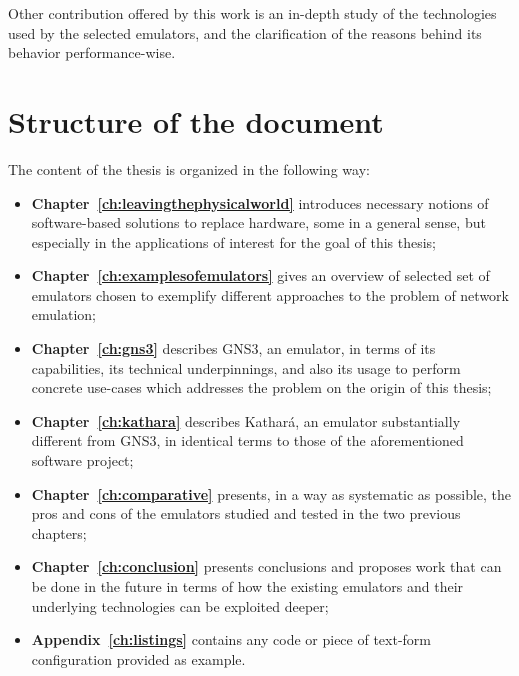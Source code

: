 Other contribution offered by this work is an in-depth study of the technologies used by the selected emulators, and the clarification of the reasons behind its behavior performance-wise.

\section{Structure of the document}
\label{sec:structure}

The content of the thesis is organized in the following way:
\begin{itemize}
  \item \textbf{Chapter~\ref{ch:leavingthephysicalworld}} introduces necessary notions of software-based solutions to replace hardware, some in a general sense, but especially in the applications of interest for the goal of this thesis;
  \item \textbf{Chapter~\ref{ch:examplesofemulators}} gives an overview of selected set of emulators chosen to exemplify different approaches to the problem of network emulation;
  \item \textbf{Chapter~\ref{ch:gns3}} describes GNS3, an emulator, in terms of its capabilities, its technical underpinnings, and also its usage to perform concrete use-cases which addresses the problem on the origin of this thesis;
  \item \textbf{Chapter~\ref{ch:kathara}} describes Kathará, an emulator substantially different from GNS3, in identical terms to those of the aforementioned software project;
  \item \textbf{Chapter~\ref{ch:comparative}} presents, in a way as systematic as possible, the pros and cons of the emulators studied and tested in the two previous chapters;
  \item \textbf{Chapter~\ref{ch:conclusion}} presents conclusions and proposes work that can be done in the future in terms of how the existing emulators and their underlying technologies can be exploited deeper;
  \item \textbf{Appendix~\ref{ch:listings}} contains any code or piece of text-form configuration provided as example.
\end{itemize}


